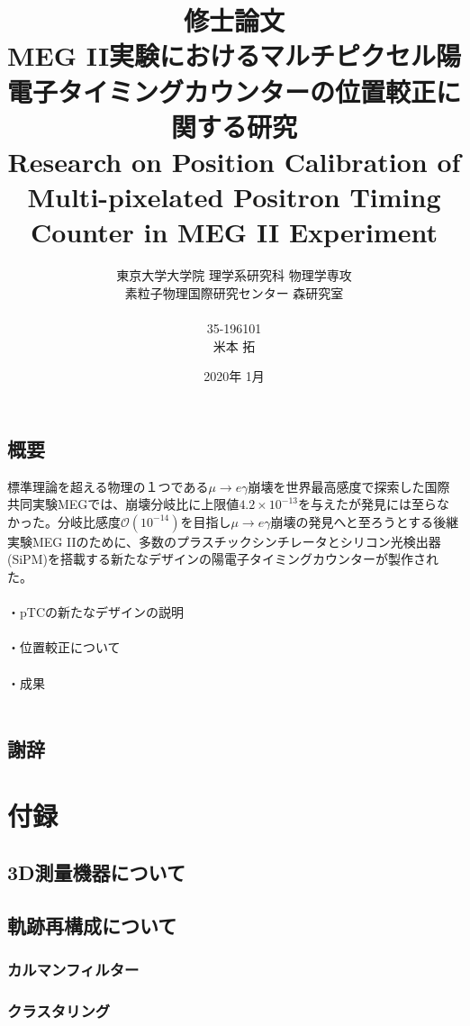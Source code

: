 \documentclass[report]{jsbook}
\title{
修士論文\\[1.8cm]
{\bf MEG II実験におけるマルチピクセル陽電子タイミングカウンターの位置較正に関する研究} \\
{\LARGE Research on Position Calibration of Multi-pixelated Positron Timing Counter in MEG II Experiment}
\\[0.8cm]}
\author{東京大学大学院 理学系研究科 物理学専攻\\
素粒子物理国際研究センター 森研究室\\ \\
35-196101\\[2.5mm]
\LARGE 米本 拓}
\date{2020年 1月}
\begin{document}
\maketitle
\chapter*{概要}

標準理論を超える物理の１つである$\mu \to e\gamma$崩壊を世界最高感度で探索した国際共同実験MEGでは、崩壊分岐比に上限値$4.2 \times 10^{-13}$を与えたが発見には至らなかった。分岐比感度$\mathcal{O}(10^{-14})$を目指し$\mu \to e\gamma$崩壊の発見へと至ろうとする後継実験MEG IIのために、多数のプラスチックシンチレータとシリコン光検出器(SiPM)を搭載する新たなデザインの陽電子タイミングカウンターが製作された。\\ \\
・pTCの新たなデザインの説明 \\ \\
・位置較正について \\ \\
・成果 \\ \\

\setcounter{tocdepth}{2}
\tableofcontents







\chapter*{謝辞}

\part{付録}
\appendix
\chapter{3D測量機器について}
\chapter{軌跡再構成について}
\section{カルマンフィルター}
\section{クラスタリング}
\end{document}

